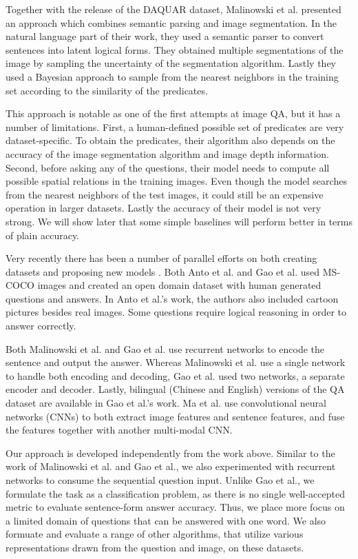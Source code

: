 \documentclass{article} %
\renewcommand{\#}[1]{\textbf{#1}}
\begin{document}
Together with the release of the DAQUAR dataset, Malinowski et al. presented 
an approach which combines semantic parsing and image segmentation. In the natural 
language part of their work, they used a semantic parser \cite{liang13} to convert 
sentences into latent logical forms. They obtained multiple segmentations of the 
image by sampling the uncertainty of the segmentation algorithm. Lastly they used 
a Bayesian approach to sample from the nearest neighbors in the 
training set according to the similarity of the predicates.

This approach is notable as one of the first attempts at image QA, 
but it has a number of limitations. First, a human-defined possible 
set of predicates are very dataset-specific. To obtain the 
predicates, their algorithm also depends on the accuracy of the image 
segmentation algorithm and image depth information. Second, before 
asking any of the questions, their model needs to compute all possible 
spatial relations in the training images. Even though the model 
searches from the nearest neighbors of the test images, it 
could still be an expensive 
operation in larger datasets. Lastly the accuracy of their model is 
not very strong. We will show later that some simple baselines will 
perform better in terms of plain accuracy.

Very recently there has been a number of parallel efforts on both 
creating datasets and proposing new models 
\cite{antol14, malinowski15, gao15, ma15}. Both Anto et al. 
\cite{antol14} and Gao et al.
\cite{gao15} used MS-COCO \cite{mscoco} images and created an 
open domain dataset with human generated questions and answers. In 
Anto et al.'s work, the authors also included cartoon pictures 
besides real images. Some questions require logical reasoning 
in order to answer correctly.

Both Malinowski et al. \cite{malinowski15} and Gao et al. \cite{gao15} 
use recurrent networks to encode the 
sentence and output the answer. Whereas Malinowski et al. use a single 
network to handle both encoding and decoding, Gao et al. used two networks,
a separate encoder and decoder. Lastly, bilingual (Chinese and English) 
versions of the QA dataset are available in Gao et al.'s work. 
Ma et al. \cite{ma15} use convolutional neural networks (CNNs) 
to both extract image 
features and sentence features, and fuse the features together with another 
multi-modal CNN. 

Our approach is developed independently from the work above. 
Similar to the work of Malinowski et al.
and Gao et al., we also experimented with recurrent 
networks to consume the sequential question input. Unlike Gao et al.,
we formulate the task as a classification problem, as there is no
single well-accepted metric to evaluate sentence-form answer accuracy. 
Thus, we place more focus on a limited domain of questions that 
can be answered with one word. We also formuate and evaluate a
range of other algorithms, that utilize various representations
drawn from the question and image, on these datasets.
\end{document}
